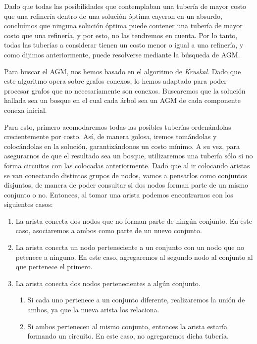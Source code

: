 Dado que todas las posibilidades que contemplaban una tubería de mayor costo que una refinería dentro de una solución óptima cayeron en un absurdo, concluímos que ninguna solución óptima puede contener una tubería de mayor costo que una refinería, y por esto, no las tendremos en cuenta. Por lo tanto, todas las tuberías a considerar tienen un costo menor o igual a una refinería, y como dijimos anteriormente, puede resolverse mediante la búsqueda de AGM.

Para buscar el AGM, nos hemos basado en el algoritmo de {\it Kruskal}.  Dado que este algoritmo opera sobre grafos conexos, lo hemos adaptado para poder procesar grafos que no necesariamente son conexos. Buscaremos que la solución hallada sea un bosque en el cual cada árbol sea un AGM de cada componente conexa inicial.

Para esto, primero acomodaremos todas las posibles tuberías ordenándolas crecientemente por costo. Así, de manera golosa, iremos tomándolas y colocándolas en la solución, garantizándonos un costo mínimo. A su vez, para asegurarnos de que el resultado sea un bosque, utilizaremos una tubería sólo si no forma circuitos con las colocadas anteriormente. Dado que al ir colocando aristas se van conectando distintos grupos de nodos, vamos a pensarlos como conjuntos disjuntos, de manera de poder consultar si dos nodos forman parte de un mismo conjunto o no.  Entonces, al tomar una arista podemos encontrarnos con los siguientes casos:

\begin{enumerate}
	\item La arista conecta dos nodos que no forman parte de ningún conjunto.  En este caso, asociaremos a ambos como parte de un nuevo conjunto.
	\item La arista conecta un nodo perteneciente a un conjunto con un nodo que no petenece a ninguno.  En este caso, agregaremos al segundo nodo al conjunto al que pertenece el primero.
	\item La arista conecta dos nodos pertenecientes a algún conjunto.
	
	\begin{enumerate}
		\item Si cada uno pertenece a un conjunto diferente, realizaremos la unión de ambos, ya que la nueva arista los relaciona.
		\item Si ambos pertenecen al mismo conjunto, entonces la arista estaría formando un circuito.  En este caso, no agregaremos dicha tubería.
	\end{enumerate}
\end{enumerate}

